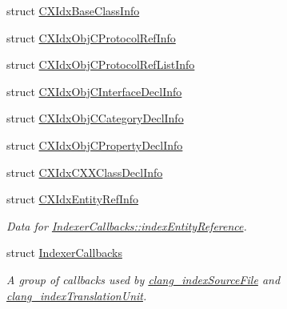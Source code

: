 \begin{DoxyCompactItemize}
\item 
struct \mbox{\hyperlink{structCXIdxBaseClassInfo}{C\+X\+Idx\+Base\+Class\+Info}}
\item 
struct \mbox{\hyperlink{structCXIdxObjCProtocolRefInfo}{C\+X\+Idx\+Obj\+C\+Protocol\+Ref\+Info}}
\item 
struct \mbox{\hyperlink{structCXIdxObjCProtocolRefListInfo}{C\+X\+Idx\+Obj\+C\+Protocol\+Ref\+List\+Info}}
\item 
struct \mbox{\hyperlink{structCXIdxObjCInterfaceDeclInfo}{C\+X\+Idx\+Obj\+C\+Interface\+Decl\+Info}}
\item 
struct \mbox{\hyperlink{structCXIdxObjCCategoryDeclInfo}{C\+X\+Idx\+Obj\+C\+Category\+Decl\+Info}}
\item 
struct \mbox{\hyperlink{structCXIdxObjCPropertyDeclInfo}{C\+X\+Idx\+Obj\+C\+Property\+Decl\+Info}}
\item 
struct \mbox{\hyperlink{structCXIdxCXXClassDeclInfo}{C\+X\+Idx\+C\+X\+X\+Class\+Decl\+Info}}
\item 
struct \mbox{\hyperlink{structCXIdxEntityRefInfo}{C\+X\+Idx\+Entity\+Ref\+Info}}
\begin{DoxyCompactList}\small\item\em Data for \mbox{\hyperlink{structIndexerCallbacks_a6d93809e7743a590beafa0387ac145dc}{Indexer\+Callbacks\+::index\+Entity\+Reference}}. \end{DoxyCompactList}\item 
struct \mbox{\hyperlink{structIndexerCallbacks}{Indexer\+Callbacks}}
\begin{DoxyCompactList}\small\item\em A group of callbacks used by \mbox{\hyperlink{group__CINDEX__HIGH_gaa5c2ad8979779c401b91110d444e2be6}{clang\+\_\+index\+Source\+File}} and \mbox{\hyperlink{group__CINDEX__HIGH_gab12a0795c7d7be6e7ec85679faf3f8e9}{clang\+\_\+index\+Translation\+Unit}}. \end{DoxyCompactList}\end{DoxyCompactItemize}
